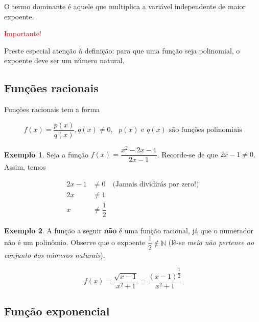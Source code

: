 \documentclass[12pt,openright,twoside,a4paper]{article}
\theoremstyle{definition}
\newtheorem{example}{Exemplo}[section]
\begin{document}
	O termo dominante é aquele que multiplica a variável independente de maior expoente.
	
	\begin{snugshade}
		\textcolor{red}{Importante!}
		
		Preste especial atenção à definição: para que uma função seja polinomial, o expoente deve ser um número natural. 
	\end{snugshade}
	
	\subsection{Funções racionais}
	Funções racionais tem a forma
	
	\begin{equation}
		f(x) = \dfrac{p(x)}{q(x)}, q(x) \neq 0, \text{ $p(x)$ e $q(x)$ são funções polinomiais}
	\end{equation}
	
	\begin{example}
		Seja a função $f(x) = \displaystyle \dfrac{x^2 - 2x - 1}{2x-1}$. Recorde-se de que $2x-1 \neq 0$. Assim, temos
		
		\begin{align*}
			2x - 1 &\neq 0 \quad \text{(Jamais dividirás por zero!)}\\
			2x &\neq 1\\
			x &\neq \dfrac{1}{2}
		\end{align*}
	\end{example}
	
	\begin{example} A função a seguir \textbf{não} é uma função racional, já que o numerador não é um polinômio. Observe que o expoente $\displaystyle\dfrac{1}{2} \notin \mathbb{N}$ (lê-se \textit{meio não pertence ao conjunto dos números naturais}).
		
		\begin{equation*}
			f(x) = \dfrac{\sqrt{x-1}}{x^2+1} = \dfrac{(x-1)^{\dfrac{1}{2}}}{x^2+1}
		\end{equation*}
	\end{example}
	
	\subsection{Função exponencial}
	
\end{document}
